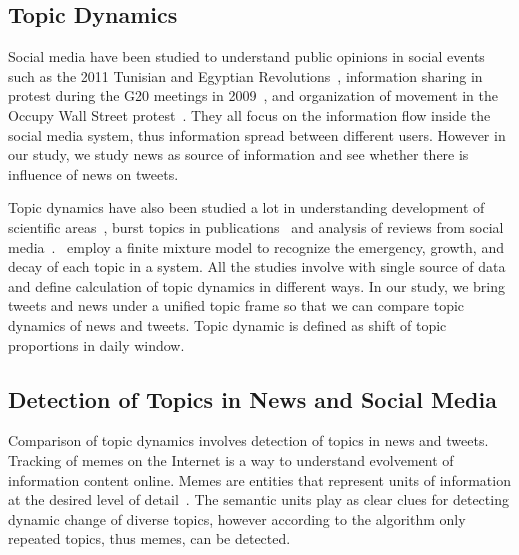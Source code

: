 \subsection{Topic Dynamics}
\label{subsec:topic}

Social media have been studied to understand public opinions in social events such as the 2011 Tunisian and Egyptian Revolutions~\cite{gonzalez2011dynamics}, information sharing in protest during the G20 meetings in 2009~\cite{earl2013protest}, and organization of movement in the Occupy Wall Street protest~\cite{conover2013geospatial}. They all focus on the information flow inside the social media system, thus information spread between different users. However in our study, we study news as source of information and see whether there is influence of news on tweets.

Topic dynamics have also been studied a lot in understanding development of scientific areas~\cite{mane2004mapping}, burst topics in publications~\cite{he2010topic} and analysis of reviews from social media~\cite{lin2012tracking}.~ employ a finite mixture model to recognize the emergency, growth, and decay of each topic in a system. All the studies involve with single source of data and define calculation of topic dynamics in different ways. In our study, we bring tweets and news under a unified topic frame so that we can compare topic dynamics of news and tweets. Topic dynamic is defined as shift of topic proportions in daily window.


\subsection{Detection of Topics in News and Social Media}
\label{subsec:detection}
Comparison of topic dynamics involves detection of topics in news and tweets. Tracking of memes on the Internet is a way to understand evolvement of information content online. Memes are entities that represent units of information at the desired level of detail~\cite{ratkiewicz2010detecting}. The semantic units play as clear clues for detecting dynamic change of diverse topics, however according to the algorithm only repeated topics, thus memes, can be detected.

